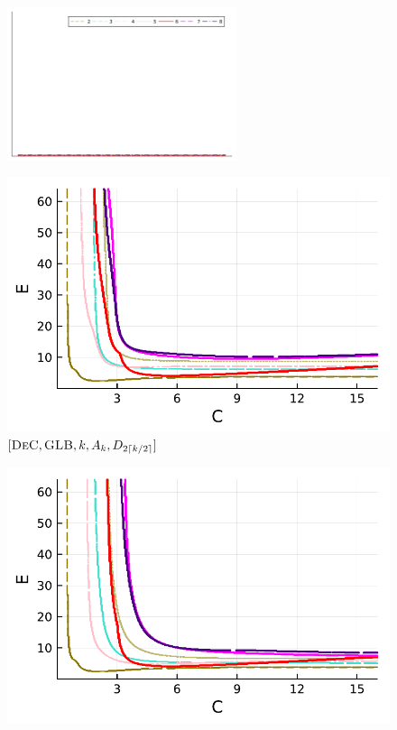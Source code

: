 \begin{figure}[!h]
	\centering
	\includegraphics[width=0.6\textwidth,trim={160 340 30 22}, clip]{pdf/pdepics/legends/colors_a-d_new_horiz_2-8_no_order.pdf}\\
	\begin{minipage}[t]{0.32\textwidth}
		\includegraphics[width=\textwidth]{pdf/pdepics/diff/IMEXDeC_gaussLobatto_all_2-8.pdf}
		\centering
		$[\textsc{DeC},\textsc{GLB}, k, A_k,D_{2\lceil k/2 \rceil}]$
	\end{minipage} 
	\begin{minipage}[t]{0.32\textwidth}
		\includegraphics[width=\textwidth]{pdf/pdepics/diff/IMEXDeC_subtimesteps_gaussLobatto_all_2-8.pdf}

\end{minipage}
\end{figure}

